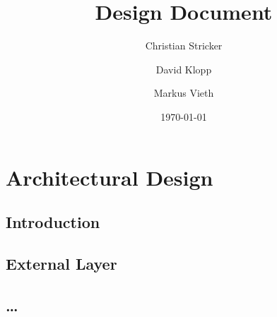 \documentclass{book}
\title{Design Document}
\author{Christian Stricker \and David Klopp \and Markus Vieth}
\date{\today}
\begin{document}
\frontmatter
\maketitle
\tableofcontents
\mainmatter
\part{Architectural Design}

\chapter{Introduction}
 
\chapter{External Layer}


\chapter{\ldots}
 
\end{document}

